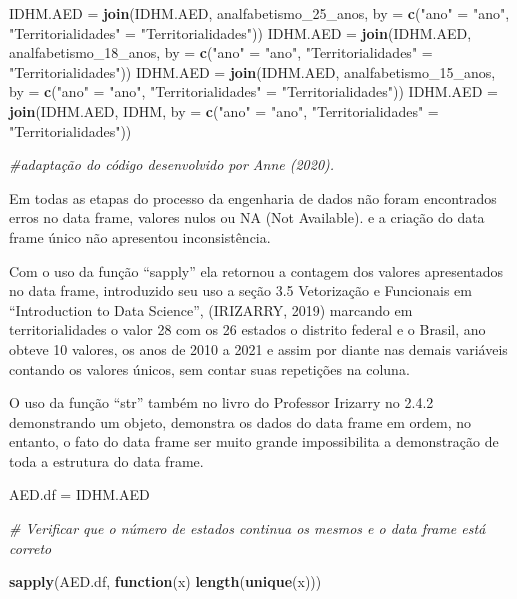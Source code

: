 \documentclass[
]{article}
\newenvironment{Shaded}{\begin{snugshade}}{\end{snugshade}}
\newcommand{\AttributeTok}[1]{\textcolor[rgb]{0.13,0.29,0.53}{#1}}
\newcommand{\CommentTok}[1]{\textcolor[rgb]{0.56,0.35,0.01}{\textit{#1}}}
\newcommand{\ControlFlowTok}[1]{\textcolor[rgb]{0.13,0.29,0.53}{\textbf{#1}}}
\newcommand{\FunctionTok}[1]{\textcolor[rgb]{0.13,0.29,0.53}{\textbf{#1}}}
\newcommand{\NormalTok}[1]{#1}
\newcommand{\OtherTok}[1]{\textcolor[rgb]{0.56,0.35,0.01}{#1}}
\newcommand{\StringTok}[1]{\textcolor[rgb]{0.31,0.60,0.02}{#1}}
\begin{document}
\begin{Shaded}
\begin{Highlighting}[]
\NormalTok{IDHM.AED }\OtherTok{=} \FunctionTok{join}\NormalTok{(IDHM.AED, analfabetismo\_25\_anos, }\AttributeTok{by =} \FunctionTok{c}\NormalTok{(}\StringTok{"ano"} \OtherTok{=} \StringTok{"ano"}\NormalTok{, }\StringTok{"Territorialidades"} \OtherTok{=} \StringTok{"Territorialidades"}\NormalTok{))}
\NormalTok{IDHM.AED }\OtherTok{=} \FunctionTok{join}\NormalTok{(IDHM.AED, analfabetismo\_18\_anos, }\AttributeTok{by =} \FunctionTok{c}\NormalTok{(}\StringTok{"ano"} \OtherTok{=} \StringTok{"ano"}\NormalTok{, }\StringTok{"Territorialidades"} \OtherTok{=} \StringTok{"Territorialidades"}\NormalTok{))}
\NormalTok{IDHM.AED }\OtherTok{=} \FunctionTok{join}\NormalTok{(IDHM.AED, analfabetismo\_15\_anos, }\AttributeTok{by =} \FunctionTok{c}\NormalTok{(}\StringTok{"ano"} \OtherTok{=} \StringTok{"ano"}\NormalTok{, }\StringTok{"Territorialidades"} \OtherTok{=} \StringTok{"Territorialidades"}\NormalTok{))}
\NormalTok{IDHM.AED }\OtherTok{=} \FunctionTok{join}\NormalTok{(IDHM.AED, IDHM, }\AttributeTok{by =} \FunctionTok{c}\NormalTok{(}\StringTok{"ano"} \OtherTok{=} \StringTok{"ano"}\NormalTok{, }\StringTok{"Territorialidades"} \OtherTok{=} \StringTok{"Territorialidades"}\NormalTok{))}

\CommentTok{\#adaptação do código desenvolvido por Anne (2020).}
\end{Highlighting}
\end{Shaded}

Em todas as etapas do processo da engenharia de dados não foram
encontrados erros no data frame, valores nulos ou NA (Not Available). e
a criação do data frame único não apresentou inconsistência.

Com o uso da função ``sapply'' ela retornou a contagem dos valores
apresentados no data frame, introduzido seu uso a seção 3.5 Vetorização
e Funcionais em ``Introduction to Data Science'', (IRIZARRY, 2019)
marcando em territorialidades o valor 28 com os 26 estados o distrito
federal e o Brasil, ano obteve 10 valores, os anos de 2010 a 2021 e
assim por diante nas demais variáveis contando os valores únicos, sem
contar suas repetições na coluna.

O uso da função ``str'' também no livro do Professor Irizarry no 2.4.2
demonstrando um objeto, demonstra os dados do data frame em ordem, no
entanto, o fato do data frame ser muito grande impossibilita a
demonstração de toda a estrutura do data frame.

\begin{Shaded}
\begin{Highlighting}[]
\NormalTok{AED.df }\OtherTok{=}\NormalTok{ IDHM.AED}



\CommentTok{\# Verificar que o número de estados continua os mesmos e o data frame está correto}


\FunctionTok{sapply}\NormalTok{(AED.df, }\ControlFlowTok{function}\NormalTok{(x) }\FunctionTok{length}\NormalTok{(}\FunctionTok{unique}\NormalTok{(x)))}
\end{Highlighting}
\end{Shaded}
\end{document}
